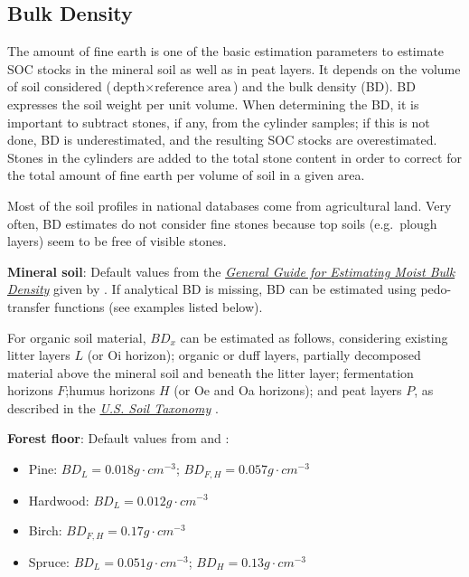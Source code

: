 \documentclass[10pt,b5paper,]{book}
\theoremstyle{definition}
\theoremstyle{definition}
\theoremstyle{definition}
\theoremstyle{remark}
\begin{document}
\hypertarget{bulk-density}{%
\subsection{Bulk Density}\label{bulk-density}}

The amount of fine earth is one of the basic estimation parameters to
estimate SOC stocks in the mineral soil as well as in peat layers. It
depends on the volume of soil considered
(\(\text{depth} \times \text{reference area}\)) and the bulk density
(BD). BD expresses the soil weight per unit volume. When determining the
BD, it is important to subtract stones, if any, from the cylinder
samples; if this is not done, BD is underestimated, and the resulting
SOC stocks are overestimated. Stones in the cylinders are added to the
total stone content in order to correct for the total amount of fine
earth per volume of soil in a given area.

Most of the soil profiles in national databases come from agricultural
land. Very often, BD estimates do not consider fine stones because top
soils (e.g.~plough layers) seem to be free of visible stones.

\textbf{Mineral soil}: Default values from the
\href{https://www.nrcs.usda.gov/wps/portal/nrcs/detail/soils/survey/office/ssr10/tr/?cid=nrcs144p2_074844}{\emph{General
Guide for Estimating Moist Bulk Density}} given by \citet{USDA_2018}. If
analytical BD is missing, BD can be estimated using pedo-transfer
functions (see examples listed below).

For organic soil material, \(BD_x\) can be estimated as follows,
considering existing litter layers \(L\) (or Oi horizon); organic or
duff layers, partially decomposed material above the mineral soil and
beneath the litter layer; fermentation horizons \(F\);humus horizons
\(H\) (or Oe and Oa horizons); and peat layers \(P\), as described in
the
\href{https://www.nrcs.usda.gov/Internet/FSE_DOCUMENTS/nrcs142p2_051232.pdf}{\emph{U.S.
Soil Taxonomy}} \citep{united1975soil}.

\textbf{Forest floor}: Default values from \citet{barney_forest_1981}
and \citet{ottmar_litter_2007}:

\begin{itemize}
\item
  Pine: \(BD_{L} = 0.018 g \cdot cm^{-3}\);
  \(BD_{F,H} = 0.057 g \cdot cm^{-3}\)
\item
  Hardwood: \(BD_{L} = 0.012 g \cdot cm^{-3}\)
\item
  Birch: \(BD_{F,H} = 0.17 g \cdot cm^{-3}\)
\item
  Spruce: \(BD_{L} = 0.051 g \cdot cm^{-3}\);
  \(BD_{H}= 0.13 g \cdot cm^{-3}\)
\end{itemize}
\end{document}
